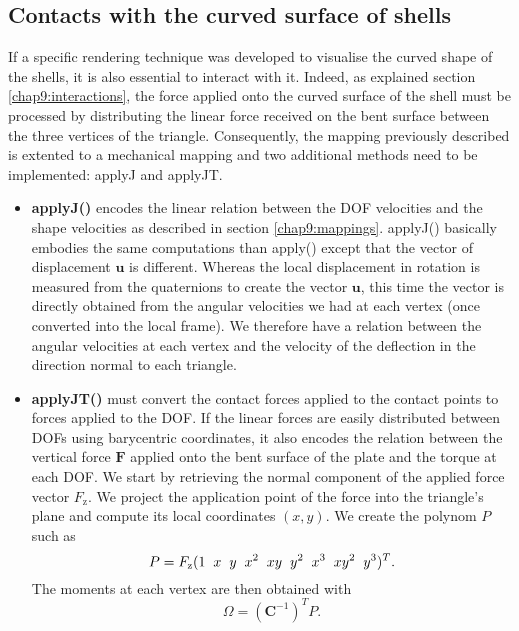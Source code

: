 	\subsection{Contacts with the curved surface of shells}
If a specific rendering technique was developed to visualise the curved shape of the shells, it is also essential to interact with it. Indeed, as explained section \ref{chap9:interactions}, the force applied onto the curved surface of the shell must be processed by distributing the linear force received on the bent surface between the three vertices of the triangle. Consequently, the mapping previously described is extented to a mechanical mapping and two additional methods need to be implemented: applyJ and applyJT. 
%
\begin{itemize}
\item \textbf{applyJ()} encodes the linear relation between the DOF velocities and the shape velocities as described in section \ref{chap9:mappings}. applyJ() basically embodies the same computations than apply() except that the vector of displacement $\mathbf{u}$ is different. Whereas the local displacement in rotation is measured from the quaternions to create the vector $\mathbf{u}$, this time the vector is directly obtained from the angular velocities we had at each vertex (once converted into the local frame). We therefore have a relation between the angular velocities at each vertex and the velocity of the deflection in the direction normal to each triangle. 
\item \textbf{applyJT()} must convert the contact forces applied to the contact points to forces applied to the DOF. If the linear forces are easily distributed between DOFs using barycentric coordinates, it also encodes the relation between the vertical force $ \mathbf{F} $ applied onto the bent surface of the plate and the torque at each DOF. We start by retrieving the normal component of the applied force vector $F_{\mathrm{z}}$. We project the application point of the force into the triangle's plane and compute its local coordinates $(x,y)$. We create the polynom $P$ such as 
%
\begin{equation}
P = F_{\mathrm{z}}(1 \hspace{0.2cm} x \hspace{0.2cm} y \hspace{0.2cm} x^2 \hspace{0.2cm} xy \hspace{0.2cm} y^2 \hspace{0.2cm} x^3 \hspace{0.2cm} xy^2 \hspace{0.2cm} y^3)^T. 
\end{equation}
%
The moments at each vertex are then obtained with 
\begin{equation}
\Omega = (\textbf{C}^{-1})^T P.
\end{equation}
\end{itemize}


